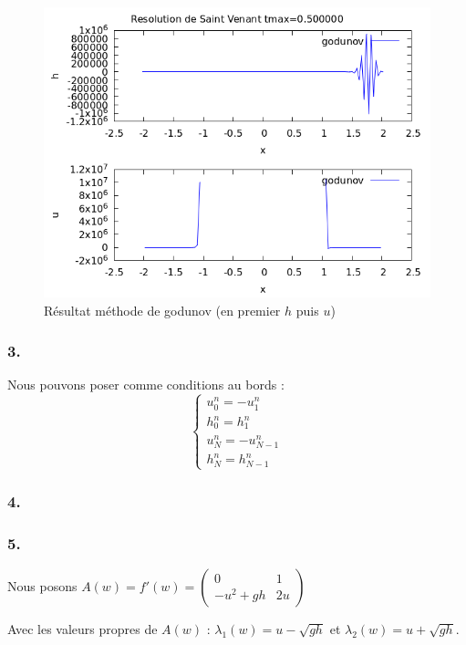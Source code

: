 \documentclass{article}
\begin{document}
\begin{figure}[H]
    \centering
    \includegraphics[scale=0.5]{figure/godunov.png}
    \caption{Résultat méthode de godunov (en premier $h$ puis $u$)}
\end{figure}

\subsubsection*{3.}

Nous pouvons poser comme conditions au bords :
\[ \left\{ \begin{matrix} 
    u_0^n = - u_1^n \\
    h_0^n = h_1^n \\
    u_N^n = - u_{N-1}^n \\
    h_N^n = h_{N-1}^n
\end{matrix} \right. \]

\subsubsection*{4.}

\subsubsection*{5.}

Nous posons $A(w) = f'(w) = \begin{pmatrix} 0 & 1 \\ -u^2+gh & 2u \end{pmatrix}$

Avec les valeurs propres de $A(w)$ : $\lambda_1(w) = u - \sqrt{gh}$ et $\lambda_2(w) = u + \sqrt{gh}$.
\end{document}
